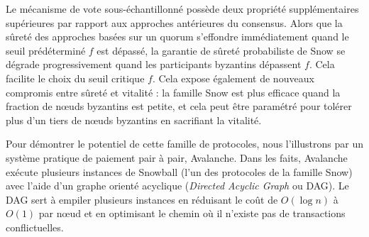 \documentclass[letterpaper,twocolumn,10pt]{article}
\newcommand{\Oh}[1]{O(#1)}
\newcommand{\editchange}[1]{{\color{orange}#1}}
\theoremstyle{definition}
\begin{document}
Le mécanisme de vote sous-échantillonné possède deux propriété supplémentaires supérieures par rapport aux approches antérieures du consensus.
Alors que la sûreté des approches basées sur un quorum s'effondre immédiatement quand le seuil prédéterminé $f$ est dépassé,
la garantie de sûreté probabiliste de Snow se dégrade progressivement quand les participants byzantins dépassent $f$.
Cela facilite le choix du seuil critique $f$.
Cela expose également de nouveaux compromis entre sûreté et vitalité : la famille Snow est plus efficace quand la fraction de nœuds byzantins est petite, et cela peut être paramétré pour tolérer plus d'un tiers de nœuds byzantins en sacrifiant la vitalité.

Pour démontrer le potentiel de cette famille de protocoles, nous l'illustrons par un système pratique de paiement pair à pair, Avalanche. Dans les faits, Avalanche exécute plusieurs instances de Snowball (l'un des protocoles de la famille Snow) avec l'aide d'un graphe orienté acyclique (\emph{Directed Acyclic Graph} ou DAG). Le DAG sert à empiler plusieurs instances en réduisant le coût de $\Oh{\log{n}}$ à $\Oh{1}$ par nœud et en optimisant le chemin où il n'existe pas de transactions conflictuelles.
%
\end{document}

